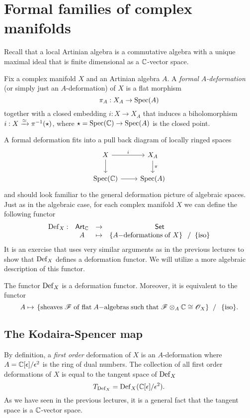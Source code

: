 \documentclass[11pt]{amsart}
\def\Spec{{\rm Spec}}
\def\Def{{\rm Def}}
\begin{document}
\section{Formal families of complex manifolds}

Recall that a local Artinian algebra is a commutative algebra with a unique maximal ideal that is finite dimensional as a $\mathbb C$-vector space. 

\begin{dfn}
Fix a complex manifold $X$ and an Artinian algebra $A$.
A {\em formal $A$-deformation} (or simply just an $A$-deformation) of $X$ is a flat morphism
\[
\pi_A : X_A \to \Spec(A)
\]
together with a closed embedding $i : X \to X_A$ that induces a biholomorphism $i : X \xrightarrow{\simeq} \pi^{-1}(\star)$, where $\star = \Spec(\CC) \to \Spec(A)$ is the closed point. 
\end{dfn}

A formal deformation fits into a pull back diagram of locally ringed spaces
\[
\begin{tikzcd}
X \ar[d] \ar[r, "i"] & X_A \ar[d, "\pi"] \\ 
{\rm Spec}(\CC) \ar[r] &{\rm Spec}(A) 
\end{tikzcd} 
\]
and should look familiar to the general deformation picture of algebraic spaces. 
Just as in the algebraic case, for each complex manifold $X$ we can define the following functor
\[
\begin{array}{cccc}
\Def_X : & \Art_\CC & \to & \Set \\
& A & \mapsto & \left\{A{\rm -deformations\;of\;}X\right\} \;\; /\;\; \{{\rm iso}\}
\end{array}
\]
It is an exercise that uses very similar arguments as in the previous lectures to show that $\Def_X$ defines a deformation functor. 
We will utilize a more algebraic description of this functor.

\begin{lem}
The functor ${\rm Def}_X$ is a deformation functor. 
Moreover, it is equivalent to the functor 
\[
A \mapsto \left. \{{\rm sheaves\;} \mathscr F{\rm \;of\;flat\;}A{\rm -algebras\;such\;that\;} \mathscr F \otimes_{A} \mathbb C \cong \mathscr O_X\} \;\; \right/ \;\; \{{\rm iso}\} .
\]
\end{lem}

\subsection{The Kodaira-Spencer map}

By definition, a {\em first order} deformation of $X$ is an $A$-deformation where $A = \mathbb C[\epsilon] / \epsilon^2$ is the ring of dual numbers. 
The collection of all first order deformations of $X$ is equal to the tangent space of $\Def_X$
\[
T_{\Def_X} = \Def_X(\CC[\epsilon]/\epsilon^2) .
\]
As we have seen in the previous lectures, it is a general fact that the tangent space is a $\mathbb C$-vector space. 
\end{document}
